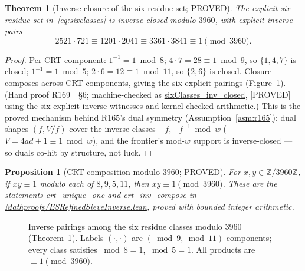 \documentclass[11pt,a4paper]{article}
\newtheorem{theorem}{Theorem}
\newtheorem{proposition}{Proposition}
\theoremstyle{definition}
\begin{document}
\begin{theorem}[Inverse-closure of the six-residue set; PROVED]
  \label{thm:s2}
  The explicit six-residue set in~\eqref{eq:sixclasses} is inverse-closed
  modulo $3960$, with explicit inverse pairs
  \begin{equation}
    \label{eq:invpairs}
    2521\cdot721\equiv1201\cdot2041\equiv3361\cdot3841\equiv1\pmod{3960}.
  \end{equation}
\end{theorem}
\begin{proof}
Per CRT component: $1^{-1}=1\bmod8$; $4\cdot7=28\equiv1\bmod9$, so
$\{1,4,7\}$ is closed; $1^{-1}=1\bmod5$; $2\cdot6=12\equiv1\bmod11$, so
$\{2,6\}$ is closed. Closure composes across CRT components, giving the
six explicit pairings (Figure~\ref{fig:invpairs}). (Hand proof
R169~\cite{R169}~\S6; machine-checked as
\url{sixClasses_inv_closed}, [PROVED] using the six explicit inverse
witnesses and kernel-checked arithmetic.) This is the proved mechanism behind R165's
dual symmetry (Assumption~\ref{asm:r165}): dual shapes $(f,V/f)$ cover
the inverse classes $-f,-f^{-1}\bmod w$ ($V=4ad+1\equiv1\bmod w$), and
the frontier's mod-$w$ support is inverse-closed --- so duals co-hit by
structure, not luck.
\end{proof}

\begin{proposition}[CRT composition modulo $3960$; PROVED]
  \label{prop:crtcomp}
  For $x,y\in\mathbb{Z}/3960\mathbb{Z}$, if $xy\equiv1$ modulo
  each of $8,9,5,11$, then $xy\equiv1\pmod{3960}$.
  These are the statements \url{crt_unique_one} and
  \url{crt_inv_compose} in \url{Mathproofs/ESRefinedSieveInverse.lean},
  proved with bounded integer arithmetic.
\end{proposition}

\begin{figure}[t]
  \centering
  \caption{Inverse pairings among the six residue classes modulo $3960$
    (Theorem~\ref{thm:s2}). Labels $(\cdot,\cdot)$ are
    $(\bmod9,\bmod11)$ components; every class satisfies $\bmod8=1$,
    $\bmod5=1$. All products are $\equiv1\pmod{3960}$.}
  \label{fig:invpairs}
\end{figure}
\end{document}
